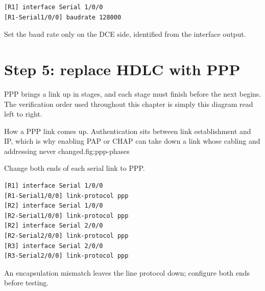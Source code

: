 \begin{lstlisting}[style=dcnterminal]
[R1] interface Serial 1/0/0
[R1-Serial1/0/0] baudrate 128000
\end{lstlisting}

\begin{keyidea}
Set the baud rate only on the DCE side, identified from the interface output.
\end{keyidea}

\section{Step 5: replace HDLC with PPP}

PPP brings a link up in stages, and each stage must finish before the
next begins. The verification order used throughout this chapter is
simply this diagram read left to right.

\begin{utpfig}{How a PPP link comes up. Authentication sits between
link establishment and IP, which is why enabling PAP or CHAP can take down a
link whose cabling and addressing never changed.}{fig:ppp-phases}
\end{utpfig}

Change both ends of each serial link to PPP.
\begin{lstlisting}[style=dcnterminal]
[R1] interface Serial 1/0/0
[R1-Serial1/0/0] link-protocol ppp
[R2] interface Serial 1/0/0
[R2-Serial1/0/0] link-protocol ppp
[R2] interface Serial 2/0/0
[R2-Serial2/0/0] link-protocol ppp
[R3] interface Serial 2/0/0
[R3-Serial2/0/0] link-protocol ppp
\end{lstlisting}
An encapsulation mismatch leaves the line protocol down; configure both ends before testing.


